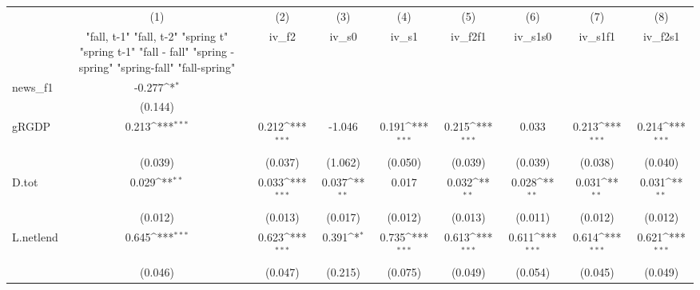 {
\def\sym#1{\ifmmode^{#1}\else\(^{#1}\)\fi}
\begin{tabular}{l*{8}{c}}
\toprule
            &\multicolumn{1}{c}{(1)}&\multicolumn{1}{c}{(2)}&\multicolumn{1}{c}{(3)}&\multicolumn{1}{c}{(4)}&\multicolumn{1}{c}{(5)}&\multicolumn{1}{c}{(6)}&\multicolumn{1}{c}{(7)}&\multicolumn{1}{c}{(8)}\\
            &\multicolumn{1}{c}{  "fall, t-1" "fall, t-2" "spring t" "spring t-1"  "fall - fall" "spring - spring" "spring-fall" "fall-spring" }&\multicolumn{1}{c}{iv\_f2}&\multicolumn{1}{c}{iv\_s0}&\multicolumn{1}{c}{iv\_s1}&\multicolumn{1}{c}{iv\_f2f1}&\multicolumn{1}{c}{iv\_s1s0}&\multicolumn{1}{c}{iv\_s1f1}&\multicolumn{1}{c}{iv\_f2s1}\\
\midrule
news\_f1     &      -0.277\sym{*}  &                     &                     &                     &                     &                     &                     &                     \\
            &     (0.144)         &                     &                     &                     &                     &                     &                     &                     \\
\addlinespace
gRGDP       &       0.213\sym{***}&       0.212\sym{***}&      -1.046         &       0.191\sym{***}&       0.215\sym{***}&       0.033         &       0.213\sym{***}&       0.214\sym{***}\\
            &     (0.039)         &     (0.037)         &     (1.062)         &     (0.050)         &     (0.039)         &     (0.039)         &     (0.038)         &     (0.040)         \\
\addlinespace
D.tot       &       0.029\sym{**} &       0.033\sym{***}&       0.037\sym{**} &       0.017         &       0.032\sym{**} &       0.028\sym{**} &       0.031\sym{**} &       0.031\sym{**} \\
            &     (0.012)         &     (0.013)         &     (0.017)         &     (0.012)         &     (0.013)         &     (0.011)         &     (0.012)         &     (0.012)         \\
\addlinespace
L.netlend   &       0.645\sym{***}&       0.623\sym{***}&       0.391\sym{*}  &       0.735\sym{***}&       0.613\sym{***}&       0.611\sym{***}&       0.614\sym{***}&       0.621\sym{***}\\
            &     (0.046)         &     (0.047)         &     (0.215)         &     (0.075)         &     (0.049)         &     (0.054)         &     (0.045)         &     (0.049)         \\

\end{tabular}}

